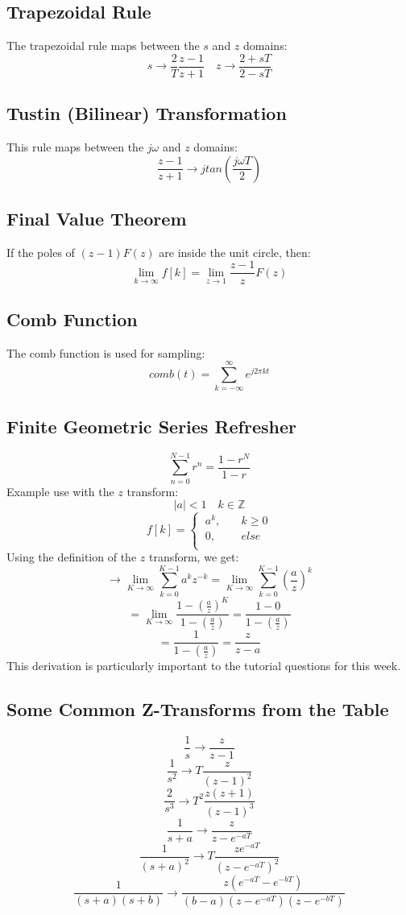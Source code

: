 \documentclass[journal]{IEEEtran}
\begin{document}
\subsection{\textbf{Trapezoidal Rule}}
The trapezoidal rule maps between the $s$ and $z$ domains:
\[
    s \rightarrow \frac{2}{T}\frac{z - 1}{z + 1} \quad z \rightarrow \frac{2 + sT}{2 - sT}
\]
\subsection{\textbf{Tustin (Bilinear) Transformation}}
This rule maps between the $j\omega$ and $z$ domains:
\[
    \frac{z - 1}{z + 1} \rightarrow j tan(\frac{j\omega T}{2})
\]
\subsection{\textbf{Final Value Theorem}}
If the poles of $(z - 1)F(z)$ are inside the unit circle, then:
\[
    \lim_{k\to\infty} f[k] = \lim_{z\to1} \frac{z - 1}{z}F(z)
\]
\subsection{\textbf{Comb Function}}
The comb function is used for sampling:
\[
    comb(t) = \sum_{k = -\infty}^{\infty} e^{j2\pi kt}
\]
\subsection{\textbf{Finite Geometric Series Refresher}}
\[
    \sum_{n = 0}^{N - 1} r^n = \frac{1 - r^N}{1 - r}
\]
Example use with the $z$ transform:
\[
    |a| < 1 \quad k \in \mathds{Z}
\]
\[
    f[k] =
    \begin{cases}
    \ a^k, &\quad k \geq 0\\
    \ 0, &\quad else\\
    \end{cases}
\]
Using the definition of the $z$ transform, we get:
\[
    \rightarrow \lim_{K\to\infty} \sum_{k = 0}^{K - 1} a^k z^{-k} = \lim_{K\to\infty} \sum_{k = 0}^{K - 1} (\frac{a}{z})^k
\]
\[
    = \lim_{K\to\infty} \frac{1 - (\frac{a}{z})^K}{1 - (\frac{a}{z})} = \frac{1 - 0}{1 - (\frac{a}{z})}
\]
\[
    = \frac{1}{1 - (\frac{a}{z})} = \frac{z}{z - a}
\]
This derivation is particularly important to the tutorial questions for this week.
\subsection{\textbf{Some Common Z-Transforms from the Table}}
\[
    \frac{1}{s} \rightarrow \frac{z}{z - 1}
\]
\[
    \frac{1}{s^2} \rightarrow T\frac{z}{(z - 1)^2}
\]
\[
    \frac{2}{s^3} \rightarrow T^2\frac{z(z + 1)}{(z - 1)^3}
\]
\[
    \frac{1}{s + a} \rightarrow \frac{z}{z - e^{-aT}}
\]
\[
    \frac{1}{(s + a)^2} \rightarrow T\frac{ze^{-aT}}{(z - e^{-aT})^2}
\]
\[
    \frac{1}{(s + a)(s + b)} \rightarrow \frac{z(e^{-aT} - e^{-bT})}{(b - a)(z - e^{-aT})(z - e^{-bT})}
\]
\end{document}

